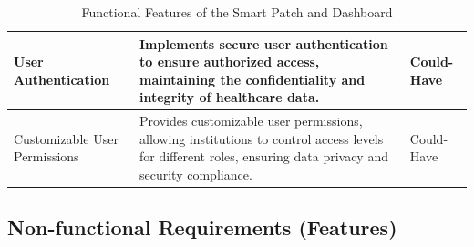 \begin{table}[h]
\begin{tabularx}{\textwidth}{|p{3cm}|X|p{2cm}|}
        User Authentication
        & Implements secure user authentication to ensure authorized access, maintaining the confidentiality and integrity of healthcare data.
        & Could-Have \\ \hline

        Customizable User Permissions
        & Provides customizable user permissions, allowing institutions to control access levels for different roles, ensuring data privacy and security compliance.
        & Could-Have \\ \hline
    \end{tabularx}
    \caption{Functional Features of the Smart Patch and Dashboard}
    \label{table:functional-sp-db}
\end{table}


\newpage
\subsection{Non-functional Requirements (Features)}
